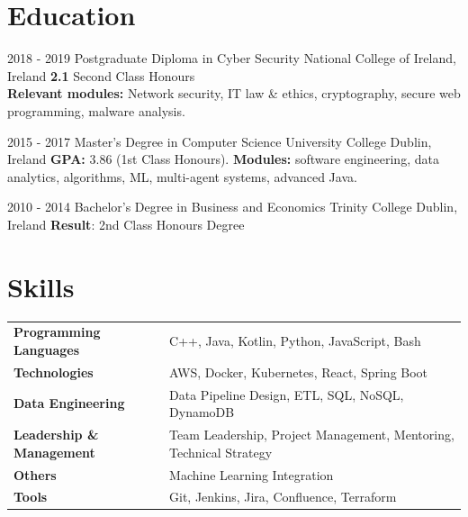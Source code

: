 \documentclass[]{cv-style}
\begin{document}

\section{Education}
\begin{entrylist}
 \entry
 {2018 - 2019}
 {Postgraduate Diploma in Cyber Security}
 {National College of Ireland, Ireland}
 { 
\textbf{2.1} Second Class Honours \\ 
 \textbf{Relevant modules:} Network security, IT law \& ethics, cryptography, secure web programming, malware analysis.
 }

  \entry
    {2015 - 2017}
    {Master's Degree in Computer Science}
    {University College Dublin, Ireland}
    { \textbf{GPA:} 3.86 (1st Class Honours). \textbf{Modules:} software engineering, data analytics, algorithms, ML, multi-agent systems, advanced Java. }
   

  \entry
    {2010 - 2014}
    {Bachelor's Degree in Business and Economics}
    {Trinity College Dublin, Ireland}
    { \textbf{Result}: 2nd Class Honours Degree \\
   }
 

\end{entrylist}

\section{Skills}
\begin{tabular}{ l l }
    \textbf{Programming Languages} & C++, Java, Kotlin, Python, JavaScript, Bash \\
    \textbf{Technologies } & AWS, Docker, Kubernetes, React, Spring Boot \\
    \textbf{Data Engineering} & Data Pipeline Design, ETL, SQL, NoSQL, DynamoDB \\
    \textbf{Leadership \& Management} & Team Leadership, Project Management, Mentoring, Technical Strategy \\
    \textbf{Others} & Machine Learning Integration \\
    \textbf{Tools} & Git, Jenkins, Jira, Confluence, Terraform \\
\end{tabular}
\end{document}
